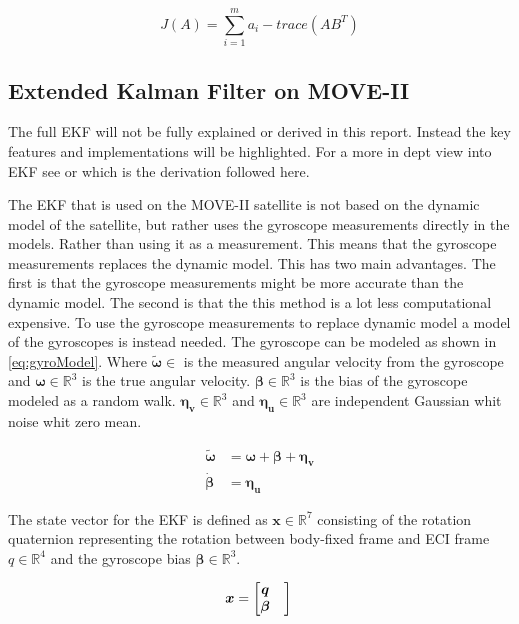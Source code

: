 \begin{equation}\label{eq:Wahba'sProblemReformul}
	J(A) = \sum\limits_{i=1}^{m}a_i - trace(AB^T)
\end{equation}

\subsection{Extended Kalman Filter on MOVE-II}\label{chap:EKF_MOVE_II}
The full EKF will not be fully explained or derived in this report. Instead the key features and implementations will be highlighted. For a more in dept view into EKF see \cite{DavidThesis} or \cite{indirectKalman} which is the derivation followed here.  

The EKF that is used on the MOVE-II satellite is not based on the dynamic model of the satellite, but rather uses the gyroscope measurements directly in the models. Rather than using it as a measurement. This means that the gyroscope measurements replaces the dynamic model. This has two main advantages. The first is that the gyroscope measurements might be more accurate than the dynamic model. The second is that the this method is a lot less computational expensive. To use the gyroscope measurements to replace dynamic model a model of the gyroscopes is instead needed. The gyroscope can be modeled as shown in \autoref{eq:gyroModel}. Where $\tilde{\boldsymbol{\omega}} \in $ is the measured angular velocity from the gyroscope and $\boldsymbol{\omega} \in \mathbb{R}^{3}$ is the true angular velocity. $\boldsymbol{\beta} \in \mathbb{R}^{3}$ is the bias of the gyroscope modeled as a random walk. $\boldsymbol{\eta_v} \in \mathbb{R}^{3}$ and $\boldsymbol{\eta_u} \in \mathbb{R}^{3}$ are independent Gaussian whit noise whit zero mean.               

\begin{align}
	\tilde{\boldsymbol{\omega}} &= \boldsymbol{\omega} + \boldsymbol{\beta} + \boldsymbol{\eta_v}\label{eq:gyroModel}\\
	\dot{\boldsymbol{\beta}} &= \boldsymbol{\eta_u}\label{eq:randomWalk} 
\end{align}

The state vector for the EKF is defined as $\boldsymbol{x} \in \mathbb{R}^{7}$ consisting of the rotation quaternion representing the rotation between body-fixed frame and ECI frame $q \in \mathbb{R}^{4}$ and the gyroscope bias $\boldsymbol{\beta} \in \mathbb{R}^{3}$.

\begin{equation}\label{eq:stateVectorEKF}
	\boldsymbol{x} = \begin{bmatrix}
    		\boldsymbol{q} \\ \boldsymbol{\beta} & 
		 \end{bmatrix}\\
\end{equation}

